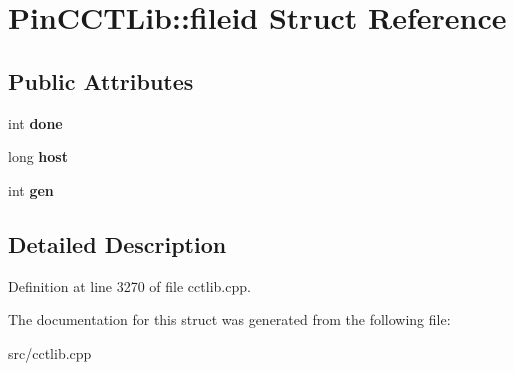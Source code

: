 \hypertarget{structPinCCTLib_1_1fileid}{\section{Pin\-C\-C\-T\-Lib\-:\-:fileid Struct Reference}
\label{structPinCCTLib_1_1fileid}
}
\subsection*{Public Attributes}
\begin{DoxyCompactItemize}
\item 
\hypertarget{structPinCCTLib_1_1fileid_a92048d443e7f1dbbbae5faf6dfb440ae}{int {\bfseries done}}\label{structPinCCTLib_1_1fileid_a92048d443e7f1dbbbae5faf6dfb440ae}

\item 
\hypertarget{structPinCCTLib_1_1fileid_a056723701f2093fdf7e50883263ccfe5}{long {\bfseries host}}\label{structPinCCTLib_1_1fileid_a056723701f2093fdf7e50883263ccfe5}

\item 
\hypertarget{structPinCCTLib_1_1fileid_a9cadea1c8ef3d416414f8012b8a0eb51}{int {\bfseries gen}}\label{structPinCCTLib_1_1fileid_a9cadea1c8ef3d416414f8012b8a0eb51}

\end{DoxyCompactItemize}


\subsection{Detailed Description}


Definition at line 3270 of file cctlib.\-cpp.



The documentation for this struct was generated from the following file\-:\begin{DoxyCompactItemize}
\item 
src/cctlib.\-cpp\end{DoxyCompactItemize}
